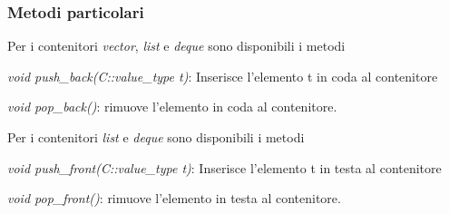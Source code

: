 \subsubsection{Metodi particolari}

Per i contenitori \textit{vector}, \textit{list} e \textit{deque} sono disponibili i metodi

\begin{description}
	\item \textit{void push\_back(C::value\_type t)}: Inserisce l'elemento t in coda al contenitore
	\item \textit{void pop\_back()}: rimuove l'elemento in coda al contenitore.
\end{description}

Per i contenitori \textit{list} e \textit{deque} sono disponibili i metodi

\begin{description}
	\item \textit{void push\_front(C::value\_type t)}: Inserisce l'elemento t in testa al contenitore
	\item \textit{void pop\_front()}: rimuove l'elemento in testa al contenitore.
\end{description}
